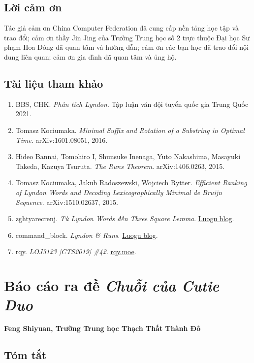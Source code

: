 \documentclass[11pt]{article}
\begin{document}
\subsection*{Lời cảm ơn}

Tác giả cảm ơn China Computer Federation đã cung cấp nền tảng học tập và trao
đổi; cảm ơn thầy Jin Jing của Trường Trung học số 2 trực thuộc Đại học Sư phạm
Hoa Đông đã quan tâm và hướng dẫn; cảm ơn các bạn học đã trao đổi nội dung liên
quan; cảm ơn gia đình đã quan tâm và ủng hộ.

\subsection*{Tài liệu tham khảo}

\begin{enumerate}
  \item BBS, CHK. \emph{Phân tích Lyndon}. Tập luận văn đội tuyển quốc gia Trung
  Quốc 2021.
  \item Tomasz Kociumaka. \emph{Minimal Suffix and Rotation of a Substring in
  Optimal Time}. arXiv:1601.08051, 2016.
  \item Hideo Bannai, Tomohiro I, Shunsuke Inenaga, Yuto Nakashima, Masayuki
  Takeda, Kazuya Tsuruta. \emph{The Runs Theorem}. arXiv:1406.0263, 2015.
  \item Tomasz Kociumaka, Jakub Radoszewski, Wojciech Rytter. \emph{Efficient
  Ranking of Lyndon Words and Decoding Lexicographically Minimal de Bruijn
  Sequence}. arXiv:1510.02637, 2015.
  \item zghtyarecrenj. \emph{Từ Lyndon Words đến Three Square Lemma}.
  \href{https://www.luogu.com.cn/blog/zght/lyndon}{Luogu blog}.
  \item command\_block. \emph{Lyndon \& Runs}.
  \href{https://www.luogu.com.cn/blog/command-block/lyndon-runs}{Luogu blog}.
  \item rqy. \emph{LOJ3123 [CTS2019] \#42}.
  \href{https://rqy.moe/Solutions/loj3123/}{rqy.moe}.
\end{enumerate}

\section{Báo cáo ra đề \emph{Chuỗi của Cutie Duo}}

\begin{center}
\textbf{Feng Shiyuan, Trường Trung học Thạch Thất Thành Đô}
\end{center}

\subsection*{Tóm tắt}
\end{document}
